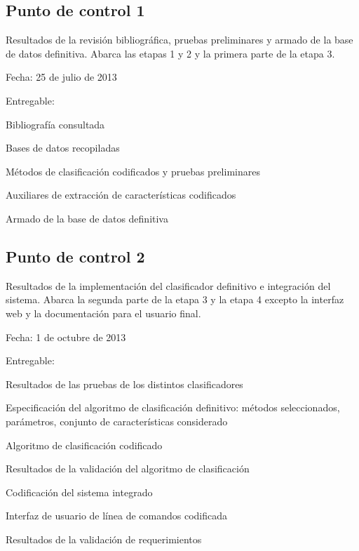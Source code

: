 \documentclass[12pt,bibliography=oldstyle,DIV=12,parskip=full-,titlepage]{scrartcl}
\begin{document}
\subsection{Punto de control 1}
Resultados de la revisión bibliográfica, pruebas preliminares y armado
de la base de datos definitiva.  Abarca las etapas 1 y 2 y la primera
parte de la etapa 3.
\begin{description*}
  \item[Fecha:] 25 de julio de 2013
  \item[Entregable:]
  \item
    \begin{minipage}{\textwidth}
      \medskip
      \begin{itemize*}
      \item Bibliografía consultada
      \item Bases de datos recopiladas
      \item Métodos de clasificación codificados y pruebas preliminares
      \item Auxiliares de extracción de características codificados
      \item Armado de la base de datos definitiva
      \end{itemize*}
    \end{minipage}
\end{description*}
\newpage
\subsection{Punto de control 2}
Resultados de la implementación del clasificador definitivo e
integración del sistema. Abarca la segunda parte de la etapa 3 y la
etapa 4 excepto la interfaz web y la documentación para el usuario
final.
\begin{description*}
  \item[Fecha:] 1 de octubre de 2013
  \item[Entregable:]
  \item
    \begin{minipage}{\textwidth}
      \medskip
      \begin{itemize*}
      \item Resultados de las pruebas de los distintos clasificadores
      \item Especificación del algoritmo de clasificación definitivo:
        métodos seleccionados, parámetros, conjunto de características
        considerado
      \item Algoritmo de clasificación codificado
      \item Resultados de la validación del algoritmo de clasificación
      \item Codificación del sistema integrado
      \item Interfaz de usuario de línea de comandos codificada
      \item Resultados de la validación de requerimientos
      \end{itemize*}
    \end{minipage}
\end{description*}
\end{document}
